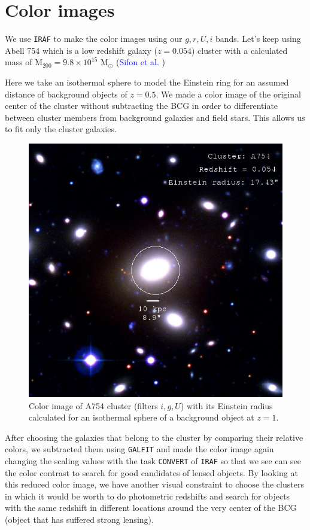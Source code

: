 \section{Color images} 

We use \texttt{IRAF} to make the color images using our $g,r,U,i$ bands. Let's keep using Abell 754 which is a low redshift galaxy ($z=0.054$) cluster with a calculated mass of $\text{M}_{200}=9.8\times 10^{15}$ $\text{M}_{\odot}$ (\textcolor{blue}{Sifon et al.} \citeyear{Reference9})

Here we take an isothermal sphere to model the Einstein ring for an assumed distance of background objects of $z=0.5$. We made a color image of the original center of the cluster without subtracting the BCG in order to differentiate between cluster members from background galaxies and field stars. This allows us to fit only the cluster galaxies. 

\begin{figure}[H]
\centering
\includegraphics[width=12cm]{images/cA754.jpg}
\caption[Color image of A754]{Color image of A754 cluster (filters $i,g,U$) with its Einstein radius calculated for an isothermal sphere of a background object at $z=1$.}
\end{figure}

After choosing the galaxies that belong to the cluster by comparing their relative colors, we subtracted them using \texttt{GALFIT} and made the color image again changing the scaling values with the task \texttt{CONVERT} of \texttt{IRAF} so that we see can see the color contrast to search for good candidates of lensed objects. By looking at this reduced color image, we have another visual constraint to choose the clusters in which it would be worth to do photometric redshifts and search for objects with the same redshift in different locations around the very center of the BCG (object that has suffered strong lensing). 

